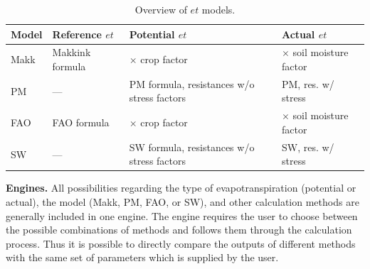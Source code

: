 \documentclass{scrreprt}
\begin{document}
%
%
%  
%
\begin{table}[ht]
  \caption{Overview of $et$ models.}
  \centering
  \begin{tabular*}{1.0\hsize}{llll}
    Model & Reference $et$  & Potential $et$                             & Actual $et$ \\
    \hline
    Makk  & Makkink formula & $\times$ crop factor                       & $\times$ soil moisture factor \\
    PM    & ---             & PM formula, resistances w/o stress factors & PM, res. w/ stress \\
    FAO   & FAO formula     & $\times$ crop factor                       & $\times$ soil moisture factor \\
    SW    & ---             & SW formula, resistances w/o stress factors & SW, res. w/ stress \\
  \end{tabular*}
  \label{tab:models}
\end{table}

\textbf{Engines.}
All possibilities regarding the type of evapotranspiration (potential or actual), the model (Makk, PM, FAO, or SW), and other calculation methods are generally included in one engine.
The engine requires the user to choose between the possible combinations of methods and follows them through the calculation process.
Thus it is possible to directly compare the outputs of different methods with the same set of parameters which is supplied by the user.
\end{document}
